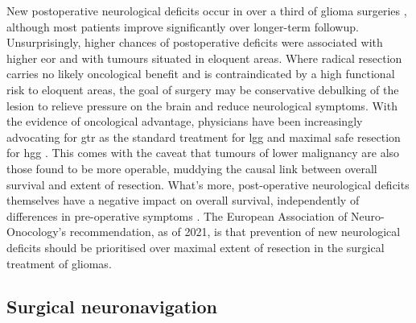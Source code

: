 New postoperative neurological deficits occur in over a third of glioma surgeries \autocite{Zetterling2020a}, although most patients improve significantly over longer-term followup.
Unsurprisingly, higher chances of postoperative deficits were associated with higher \gls{eor} and with tumours situated in eloquent areas\autocite{Zetterling2020a}.
Where radical resection carries no likely oncological benefit and is contraindicated by a high functional risk to eloquent areas, the goal of surgery may be conservative debulking of the lesion to relieve pressure on the brain and reduce neurological symptoms.
With the evidence of oncological advantage, physicians have been increasingly advocating for \gls{gtr} as the standard treatment for \gls{lgg} and maximal safe resection for \gls{hgg} \autocite{Rincon-Torroella2019}.
This comes with the caveat that tumours of lower malignancy are also those found to be more operable, muddying the causal link between overall survival and extent of resection\autocite{Weller2021}.
What's more, post-operative neurological deficits themselves have a negative impact on overall survival, independently of differences in pre-operative symptoms \autocite{Rahman2016}.
The European Association of Neuro-Onocology's recommendation, as of 2021, is that prevention of new neurological deficits should be prioritised over maximal extent of resection in the surgical treatment of gliomas\autocite{Weller2021}.


\subsection{Surgical neuronavigation}



